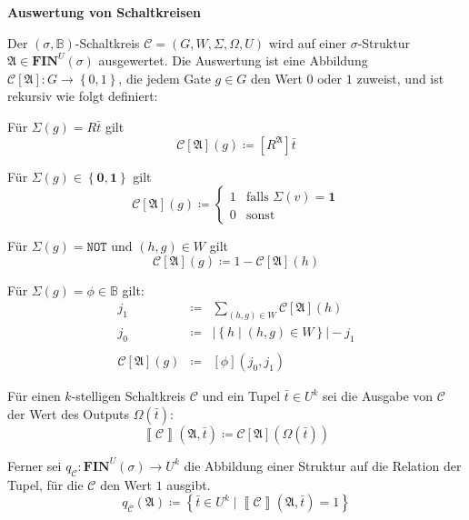 \begin{defn}
\textbf{\label{def:circuit-eval}Auswertung von Schaltkreisen}

Der $\left(\sigma,\mathbb{B}\right)$-Schaltkreis $\mathcal{C}=\left(G,W,\Sigma,\Omega,U\right)$
wird auf einer $\sigma$-Struktur $\mathfrak{A}\in\mathbf{FIN}^{U}\left(\sigma\right)$
ausgewertet. Die Auswertung ist eine Abbildung $\mathcal{C}\left[\mathfrak{A}\right]:G\rightarrow\left\{ 0,1\right\} $,
die jedem Gate $g\in G$ den Wert $0$ oder $1$ zuweist, und ist
rekursiv wie folgt definiert:

\begin{casenv}
\item Für $\Sigma\left(g\right)=R\bar{t}$ gilt 
\[
\mathcal{C}\left[\mathfrak{A}\right]\left(g\right)\coloneqq\left[R^{\mathfrak{A}}\right]\bar{t}
\]
\item Für $\Sigma\left(g\right)\in\left\{ \mathbf{0},\mathbf{1}\right\} $
gilt
\[
\mathcal{C}\left[\mathfrak{A}\right]\left(g\right)\coloneqq\begin{cases}
1 & \mathrm{falls}\,\,\Sigma\left(v\right)=\mathbf{1}\\
0 & \mathrm{sonst}
\end{cases}
\]
\item Für $\Sigma\left(g\right)=\mathtt{NOT}$ und $\left(h,g\right)\in W$
gilt 
\[
\mathcal{C}\left[\mathfrak{A}\right]\left(g\right)\coloneqq1-\mathcal{C}\left[\mathfrak{A}\right]\left(h\right)
\]
\item Für $\Sigma\left(g\right)=\phi\in\mathbb{B}$ gilt: 
\begin{eqnarray*}
j_{1} & \coloneqq & \sum_{\left(h,g\right)\in W}\mathcal{C}\left[\mathfrak{A}\right]\left(h\right)\\
j_{0} & \coloneqq & \left|\left\{ h\mid\left(h,g\right)\in W\right\} \right|-j_{1}\\
\\
\mathcal{C}\left[\mathfrak{A}\right]\left(g\right) & \coloneqq & \left[\phi\right]\left(j_{0},j_{1}\right)
\end{eqnarray*}
\end{casenv}
Für einen $k$-stelligen Schaltkreis $\mathcal{C}$ und ein Tupel
$\bar{t}\in U^{k}$ sei die Ausgabe von $\mathcal{C}$ der Wert des
Outputs $\Omega\left(\bar{t}\right)$:
\[
\left\llbracket \mathcal{C}\right\rrbracket \left(\mathfrak{A},\bar{t}\right)\coloneqq\mathcal{C}\left[\mathfrak{A}\right]\left(\Omega\left(\bar{t}\right)\right)
\]
 
\end{defn}
Ferner sei $q_{\mathcal{C}}:\mathbf{FIN}^{U}\left(\sigma\right)\rightarrow U^{k}$
die Abbildung einer Struktur auf die Relation der Tupel, für die $\mathcal{C}$
den Wert $1$ ausgibt. 
\[
q_{\mathcal{C}}\left(\mathfrak{A}\right)\coloneqq\left\{ \bar{t}\in U^{k}\mid\left\llbracket \mathcal{C}\right\rrbracket \left(\mathfrak{A},\bar{t}\right)=1\right\} 
\]

